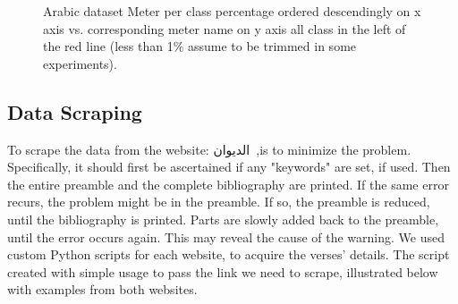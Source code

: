 \begin{figure}[!t]
 \centering
 \begin{tikzpicture}
 
 \end{tikzpicture}%
 \caption{Arabic dataset Meter per class percentage ordered descendingly on x axis vs. corresponding meter name on y axis all class in the left of the red line (less than 1\% assume to be trimmed in some experiments).	}\label{Fig:Data_Size_Distribution}
\end{figure}

\subsection{Data Scraping}\label{sec:Data_Scrap}
To scrape the data from the website: \textarabic{الديوان}~\cite{diwan},is to minimize the problem. Specifically, it should first be ascertained if any "keywords" are set, if used. Then the entire preamble and the complete bibliography are printed. If the same error recurs, the problem might be in the preamble. If so, the preamble is reduced, until the bibliography is printed. Parts are slowly added back to the preamble, until the error occurs again. This may reveal the cause of the warning. We used custom Python scripts for each website, to acquire the verses’ details. The script created with simple usage to pass the link we need to scrape, illustrated below with examples from both websites.

